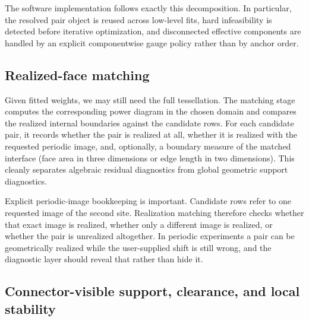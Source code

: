 \documentclass[preprint,12pt]{elsarticle}
\begin{document}
The software implementation follows exactly this decomposition. In particular,
the resolved pair object is reused across low-level fits, hard infeasibility is
detected before iterative optimization, and disconnected effective components
are handled by an explicit componentwise gauge policy rather than by anchor
order.

\subsection{Realized-face matching}
Given fitted weights, we may still need the full tessellation. The matching
stage computes the corresponding power diagram in the chosen domain and compares
the realized internal boundaries against the candidate rows. For each candidate
pair, it records whether the pair is realized at all, whether it is realized
with the requested periodic image, and, optionally, a boundary measure of the
matched interface (face area in three dimensions or edge length in two
dimensions). This cleanly separates algebraic residual diagnostics from global
geometric support diagnostics.

Explicit periodic-image bookkeeping is important. Candidate rows refer to one
requested image of the second site. Realization matching therefore checks
whether that exact image is realized, whether only a different image is
realized, or whether the pair is unrealized altogether. In periodic experiments
a pair can be geometrically realized while the user-supplied shift is still
wrong, and the diagnostic layer should reveal that rather than hide it.

\subsection{Connector-visible support, clearance, and local stability}
\label{subsec:connector_visibility}
\end{document}
